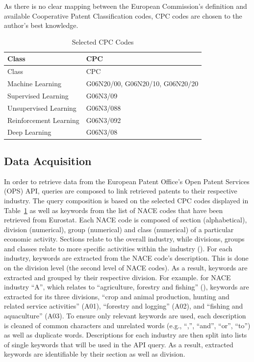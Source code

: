 \documentclass[
  11,
  a4paperpaper,
]{article}
\begin{document}
As there is no clear mapping between the European Commission's
definition and available Cooperative Patent Classification codes, CPC
codes are chosen to the author's best knowledge.


\label{tbl-cpc-codes}
\begin{longtable}[]{@{}ll@{}}
\caption{\label{tbl-cpc-codes}Selected CPC Codes}\tabularnewline
\toprule\noalign{}
Class & CPC \\
\midrule\noalign{}
\endfirsthead
\toprule\noalign{}
Class & CPC \\
\midrule\noalign{}
\endhead
\bottomrule\noalign{}
\endlastfoot
Machine Learning & G06N20/00, G06N20/10, G06N20/20 \\
Supervised Learning & G06N3/09 \\
Unsupervised Learning & G06N3/088 \\
Reinforcement Learning & G06N3/092 \\
Deep Learning & G06N3/08 \\
\end{longtable}


\subsection{Data Acquisition}\label{sec-data-acquisition}

In order to retrieve data from the European Patent Office's Open Patent
Services (OPS) API, queries are composed to link retrieved patents to
their respective industry. The query composition is based on the
selected CPC codes displayed in Table~\ref{tbl-cpc-codes} as well as
keywords from the list of NACE codes that have been retrieved from
Eurostat. Each NACE code is composed of section (alphabetical), division
(numerical), group (numerical) and class (numerical) of a particular
economic activity. Sections relate to the overall industry, while
divisions, groups and classes relate to more specific activities within
the industry (). For
each industry, keywords are extracted from the NACE code's description.
This is done on the division level (the second level of NACE codes). As
a result, keywords are extracted and grouped by their respective
division. For example. for NACE industry ``A'', which relates to
``agriculture, forestry and fishing''
(),
keywords are extracted for its three divisions, ``crop and animal
production, hunting and related service activities'' (A01), ``forestry
and logging'' (A02), and ``fishing and aquaculture'' (A03). To ensure
only relevant keywords are used, each description is cleaned of common
characters and unrelated words (e.g., ``,'', ``and'', ``or'', ``to'') as
well as duplicate words. Descriptions for each industry are then split
into lists of single keywords that will be used in the API query. As a
result, extracted keywords are identifiable by their section as well as
division.
\end{document}
